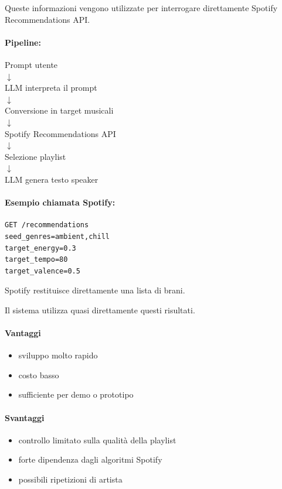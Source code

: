 \documentclass[11pt,a4paper]{article}
\begin{document}
Queste informazioni vengono utilizzate per interrogare direttamente Spotify Recommendations API.

\paragraph{Pipeline:}
\begin{center}
Prompt utente \\
$\downarrow$ \\
LLM interpreta il prompt \\
$\downarrow$ \\
Conversione in target musicali \\
$\downarrow$ \\
Spotify Recommendations API \\
$\downarrow$ \\
Selezione playlist \\
$\downarrow$ \\
LLM genera testo speaker
\end{center}

\paragraph{Esempio chiamata Spotify:}
\begin{verbatim}
GET /recommendations
seed_genres=ambient,chill
target_energy=0.3
target_tempo=80
target_valence=0.5
\end{verbatim}

Spotify restituisce direttamente una lista di brani.

Il sistema utilizza quasi direttamente questi risultati.

\paragraph{Vantaggi}
\begin{itemize}
    \item sviluppo molto rapido
    \item costo basso
    \item sufficiente per demo o prototipo
\end{itemize}

\paragraph{Svantaggi}
\begin{itemize}
    \item controllo limitato sulla qualità della playlist
    \item forte dipendenza dagli algoritmi Spotify
    \item possibili ripetizioni di artista
\end{itemize}
\end{document}
